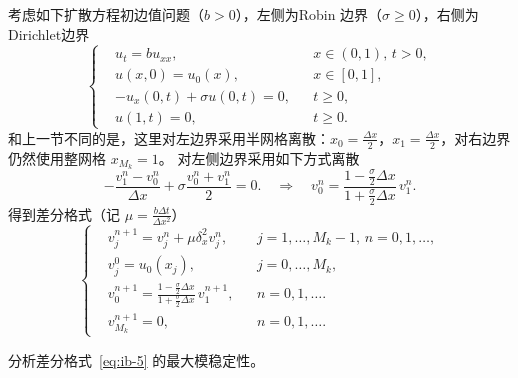 考虑如下扩散方程初边值问题（$b > 0$），左侧为Robin 边界（$\sigma \ge 0$），右侧为Dirichlet边界
\[
    \left\{
    \begin{aligned}
         & u_t = b u_{xx},                 &  & x \in (0,1),\, t > 0, \\
         & u(x,0) = u_0(x),                &  & x \in [0,1],          \\
         & - u_x(0,t) + \sigma u(0,t) = 0, &  & t \ge 0,              \\
         & u(1,t) = 0,                     &  & t \ge 0.
    \end{aligned}
    \right.
\]
和上一节不同的是，这里对左边界采用半网格离散：$x_{0} = \frac{\Delta x}2$，$x_1 = \frac{\Delta x}2$，对右边界仍然使用整网格 $x_{M_k} = 1$。
对左侧边界采用如下方式离散
\[
    - \frac{v_1^n - v_{0}^n}{\Delta x} + \sigma \frac{v_0^n + v_1^n}2 = 0.\quad\Rightarrow\quad v_0^{n} = \frac{1-\frac{\sigma}2 \Delta x}{1 +\frac{\sigma}2 \Delta x}\, v_1^{n}.
\]
得到差分格式（记 $\mu = \frac{b \Delta t}{\Delta x^2}$）
\begin{equation}
    \left\{
    \begin{aligned}
         & v_j^{n+1} = v_j^n + \mu \delta_x^2 v_j^n,                                             &  & j=1,\dots,M_k-1,\, n=0,1,\dots, \\
         & v_j^0 = u_0(x_j),                                                                     &  & j=0,\dots,M_k,                  \\
         & v_0^{n+1} = \frac{1-\frac{\sigma}2 \Delta x}{1 +\frac{\sigma}2 \Delta x}\, v_1^{n+1}, &  & n=0,1,\dots.                    \\
         & v_{M_k}^{n+1} = 0,                                                                    &  & n=0,1,\dots.
    \end{aligned}
    \right.    \label{eq:ib-5}
\end{equation}

\begin{example}
    分析差分格式~\eqref{eq:ib-5} 的最大模稳定性。
\end{example}


